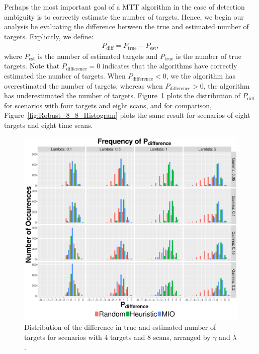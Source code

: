 Perhaps the most important goal of a MTT algorithm in the case of detection ambiguity is to correctly estimate the number of targets. Hence, we begin our analysis be evaluating the difference between the true and estimated number of targets. Explicitly, we define:
\begin{align}
	P_{\text{diff}} = P_{\text{true}} - P_{\text{est}},
\end{align}
where $P_{\text{est}}$ is the number of estimated targets and $ P_{\text{true}}$ is the number of true targets. Note that $P_{\text{difference}} = 0$ indicates that the algorithms have correctly estimated the number of targets. When $P_{\text{difference}} < 0$, we the algorithm has overestimated the number of targets, whereas when $P_{\text{difference}} > 0$, the algorithm has underestimated the number of targets. Figure~\ref{fig:Robust_4_8_Histogram} plots the distribution of $P_{\text{diff}}$ for scenarios with four targets and eight scans, and for comparison, Figure~\ref{fig:Robust_8_8_Histogram} plots the same result for scenarios of eight targets and eight time scans. 
\begin{figure}[ht]
  \centering
  \includegraphics[width=\columnwidth]{../Figures/4_8_Histogram}
  \caption{Distribution of the difference in true and estimated number of targets for scenarios with 4 targets and 8 scans, arranged by $\gamma$ and $\lambda$.}
  \label{fig:Robust_4_8_Histogram}
\end{figure}
